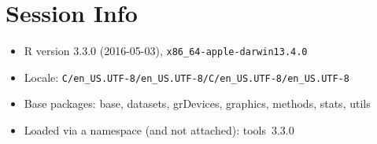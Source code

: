 \documentclass[english]{article}
\begin{document}
 
 
\section{Session Info}

\begin{itemize}\raggedright
  \item R version 3.3.0 (2016-05-03), \verb|x86_64-apple-darwin13.4.0|
  \item Locale: \verb|C/en_US.UTF-8/en_US.UTF-8/C/en_US.UTF-8/en_US.UTF-8|
  \item Base packages: base, datasets, grDevices, graphics, methods,
    stats, utils
  \item Loaded via a namespace (and not attached): tools~3.3.0
\end{itemize}
\end{document}

